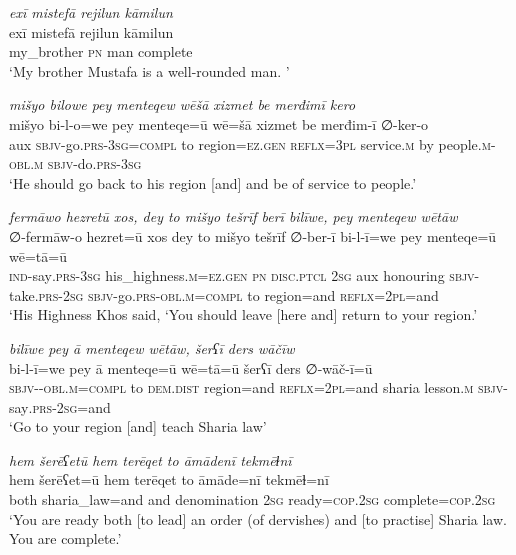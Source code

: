 \ea \label{ŽP.86}
\textit{exī mistefā rejilun kāmilun} \\ 
\gll exī mistefā rejilun kāmilun \\ 
 my\_brother \textsc{pn} man complete \\ 
\glt `My brother Mustafa is a well-rounded man. '
\z 
 
\ea \label{ŽP.87}
\textit{mišyo bilowe pey menteqew wēšā xizmet be merđimī kero} \\ 
\gll mišyo bi-l-o=we pey menteqe=ū wē=šā xizmet be merđim-ī ∅-ker-o \\ 
 aux \textsc{sbjv-}go\textsc{.prs}\textsc{-3sg}\textsc{=compl} to region\textsc{\textsc{=ez.gen}} \textsc{reflx}\textsc{=3pl} service\textsc{.m} by people\textsc{.m}\textsc{-obl}\textsc{.m} \textsc{sbjv-}do\textsc{.prs}\textsc{-3sg} \\ 
\glt `He should go back to his region [and] and be of service to people.'
\z 
 
\ea \label{ŽP.91}
\textit{fermāwo hezretū xos, dey to mišyo tešrīf berī bilīwe, pey menteqew wētāw} \\ 
\gll ∅-fermāw-o hezret=ū xos dey to mišyo tešrīf ∅-ber-ī bi-l-ī=we pey menteqe=ū wē=tā=ū \\ 
 \textsc{ind-}say\textsc{.prs}\textsc{-3sg} his\_highness\textsc{.m}\textsc{\textsc{=ez.gen}} \textsc{pn} \textsc{disc.ptcl} \textsc{2sg} aux honouring \textsc{sbjv-}take\textsc{.prs}-\textsc{2sg} \textsc{sbjv-}go\textsc{.prs}\textsc{-obl}\textsc{.m}\textsc{=compl} to region=and \textsc{reflx}=\textsc{2pl}=and \\ 
\glt `His Highness Khos said, ‘You should leave [here and] return to your region.'
\z 
 
\ea \label{ŽP.93}
\textit{bilīwe pey ā menteqew wētāw, šerʕī ders wāčīw} \\ 
\gll bi-l-ī=we pey ā menteqe=ū wē=tā=ū šerʕī ders ∅-wāč-ī=ū \\ 
 \textsc{sbjv-}\textsc{-obl}\textsc{.m}\textsc{=compl} to \textsc{dem.dist} region=and \textsc{reflx}=\textsc{2pl}=and sharia lesson\textsc{.m} \textsc{sbjv-}say\textsc{.prs-}\textsc{2sg}=and \\ 
\glt `Go to your region [and] teach Sharia law'
\z 
 
\ea \label{ŽP.94}
\textit{hem šerēʕetū hem terēqet to āmādenī tekmēɫnī} \\ 
\gll hem šerēʕet=ū hem terēqet to āmāde=nī tekmēɫ=nī \\ 
 both sharia\_law=and and denomination \textsc{2sg} ready\textsc{=cop}\textsc{.\textsc{2sg}} complete\textsc{=cop}\textsc{.\textsc{2sg}} \\ 
\glt `You are ready both [to lead] an order (of dervishes) and [to practise] Sharia law. You are complete.'
\z 
 
